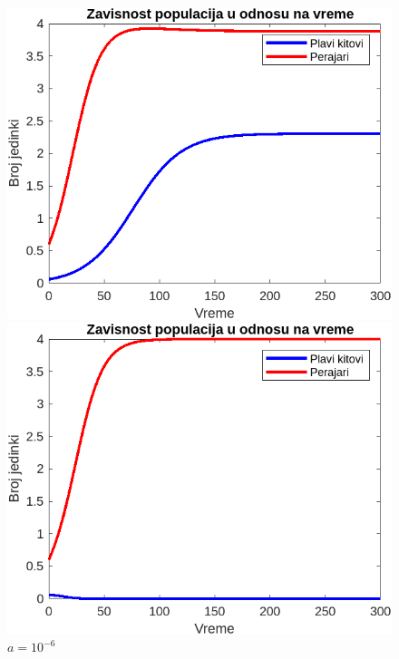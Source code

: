 \documentclass[a4paper]{article}
\begin{document}
{	\begin{figure}[h]
		\centering
		\begin{minipage}[h]{0.45\linewidth}
			\centering
			\includegraphics[width=\textwidth]{a8.png}
			\caption{$a = 10^{-8}$}
			\label{slika1:model_e8}
		\end{minipage}
		\hspace{0.5cm} 
		\begin{minipage}[h]{0.45\linewidth}
			\centering
			\includegraphics[width=\textwidth]{a6.png} 
			\caption{$a = 10^{-6}$} 
			\label{slika2:model_e6}
		\end{minipage}
	\end{figure}
	
}
\end{document}
